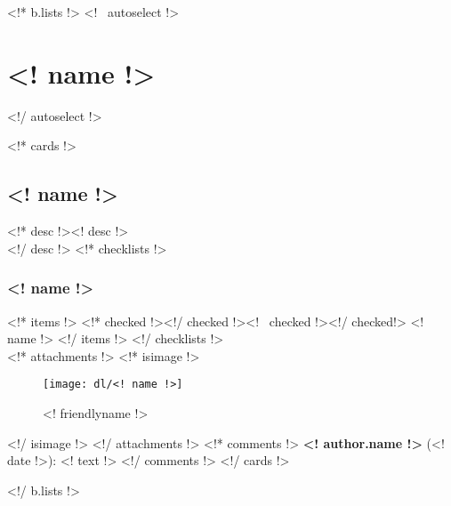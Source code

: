 



\renewcommand{\currentchapter}{FTC - 4290 - "High PHidelity"}
\renewcommand{\today}{FTC Notebook 2014-2015}
\renewcommand{\currentpart}{Revision <!b.lastmodified!>}

\setcounter{chapter}{1}
\setcounter{page}{1}
\renewcommand{\thesection}{Table of Contents}
\renewcommand\contentsname{}
\setcounter{tocdepth}{4}
\tableofcontents
\renewcommand{\thesection}{}
\clearpage



<!* b.lists !>
<!~ autoselect !>\section{<! name !>}<!/ autoselect !>

<!* cards !>
\subsection{<! name !>}
<!* desc !><! desc !>\\<!/ desc !>
<!* checklists !>
\subsubsection{<! name !>}
<!* items !>
<!* checked !>\boxchecked<!/ checked !><!~ checked !>\boxunchecked<!/ checked!> <! name !>
<!/ items !>
<!/ checklists !>\mbox{}\\

<!* attachments !>
<!* isimage !>
\begin{figure}
  \color{darkgray}
  \centering
  \texttt{[image: dl/<! name !>]}
  \caption[]{<! friendlyname !>}
  \label{fig:<! name !>}
\end{figure}
<!/ isimage !>
<!/ attachments !>
<!* comments !>
{\bf <! author.name !>} (<! date !>): <! text !>
<!/ comments !>
<!/ cards !>

<!/ b.lists !>

